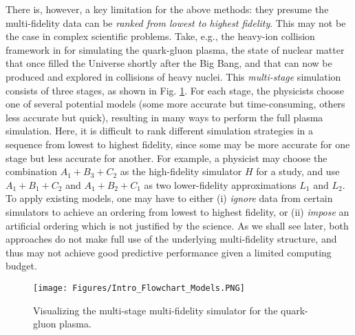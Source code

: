 \documentclass[12pt]{article}
\begin{document}
There is, however, a key limitation for the above methods: they presume the multi-fidelity data can be \textit{ranked from lowest to highest fidelity}. This may not be the case in complex scientific problems. Take, e.g., the heavy-ion collision framework in \cite{everett2021multisystem} for simulating the quark-gluon plasma, the state of nuclear matter that once filled the Universe shortly after the Big Bang, and that can now be produced and explored in collisions of heavy nuclei. This \textit{multi-stage} simulation consists of three stages, as shown in Fig. \ref{fig:intro_flowchart}. For each stage, the physicists choose one of several potential models (some more accurate but time-consuming, others less accurate but quick), resulting in many ways to perform the full plasma simulation. Here, it is difficult to rank different simulation strategies in a sequence from lowest to highest fidelity, since some may be more accurate for one stage but less accurate for another. For example, a physicist may choose the combination $A_1+B_3+C_2$ as the high-fidelity simulator $H$ for a study, and use $A_1+B_1+C_2$ and $A_1+B_2+C_1$ as two lower-fidelity approximations $L_1$ and $L_2$. To apply existing models, one may have to either (i) \textit{ignore} data from certain simulators to achieve an ordering from lowest to highest fidelity, or (ii) \textit{impose} an artificial ordering which is not justified by the science. As we shall see later, both approaches do not make full use of the underlying multi-fidelity structure, and thus may not achieve good predictive performance given a limited computing budget.

\begin{figure}[!t]
    \centering
    \texttt{[image: Figures/Intro\_Flowchart\_Models.PNG]}
    \caption{Visualizing the multi-stage multi-fidelity simulator for the quark-gluon plasma.}
    \label{fig:intro_flowchart}
\end{figure}
\end{document}
